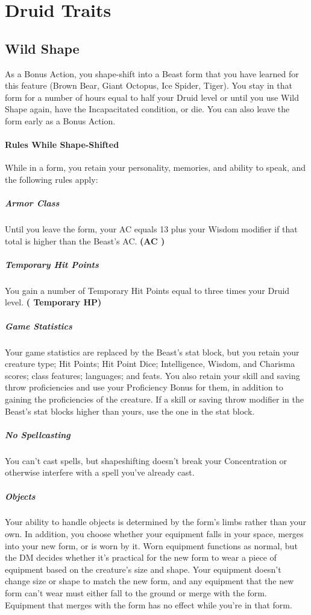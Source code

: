 \documentclass[letterpaper,openany,oneside,twocolumn]{book}
\begin{document}
\section*{Druid Traits}
\subsection*{Wild Shape}
As a Bonus Action, you shape-shift into a Beast form that you have learned for this feature (Brown Bear, Giant Octopus, Ice Spider, Tiger). You stay in that form for a number of hours equal to half your Druid level or until you use Wild Shape again, have the Incapacitated condition, or die. You can also leave the form early as a Bonus Action.
\paragraph*{Rules While Shape-Shifted} While in a form, you retain your personality, memories, and ability to speak, and the following rules apply:
\subparagraph*{Armor Class} Until you leave the form, your AC equals 13 plus your Wisdom modifier if that total is higher than the Beast's AC. \textbf{(AC )}
\subparagraph*{Temporary Hit Points} You gain a number of Temporary Hit Points equal to three times your Druid level. \textbf{( Temporary HP)}
\subparagraph*{Game Statistics} Your game statistics are replaced by the Beast's stat block, but you retain your creature type; Hit Points; Hit Point Dice; Intelligence, Wisdom, and Charisma scores; class features; languages; and feats. You also retain your skill and saving throw proficiencies and use your Proficiency Bonus for them, in addition to gaining the proficiencies of the creature. If a skill or saving throw modifier in the Beast's stat blocks higher than yours, use the one in the stat block.
\subparagraph*{No Spellcasting} You can't cast spells, but shapeshifting doesn't break your Concentration or otherwise interfere with a spell you've already cast.
\subparagraph*{Objects} Your ability to handle objects is determined by the form's limbs rather than your own. In addition, you choose whether your equipment falls in your space, merges into your new form, or is worn by it. Worn equipment functions as normal, but the DM decides whether it's practical for the new form to wear a piece of equipment based on the creature's size and shape. Your equipment doesn't change size or shape to match the new form, and any equipment that the new form can't wear must either fall to the ground or merge with the form. Equipment that merges with the form has no effect while you're in that form.
\end{document}
